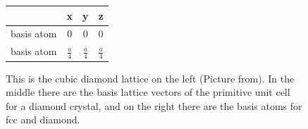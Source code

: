 \begin{figure}[tbp]
\begin{minipage}[c]{.33\linewidth}
			\begin{tabular}{c c c c} 
				\hline
				& \textbf{x} & \textbf{y} & \textbf{z}\\ 
				\hline 
				\vspace{0.2cm}
				basis atom & 0 & 0 & 0 \\
				\vspace{0.2cm}
				basis atom & $\frac{a}{4}$ & $\frac{a}{4}$ & $\frac{a}{4}$
			\end{tabular}	
		\end{minipage}
		\caption{This is the cubic diamond lattice on the left (Picture from\cite{Kittel}). In the middle there are the basis lattice vectors of the primitive unit cell for a diamond crystal, and on the right there are the basis atoms for fcc and diamond.
		}\label{fcc}
	\end{figure}

